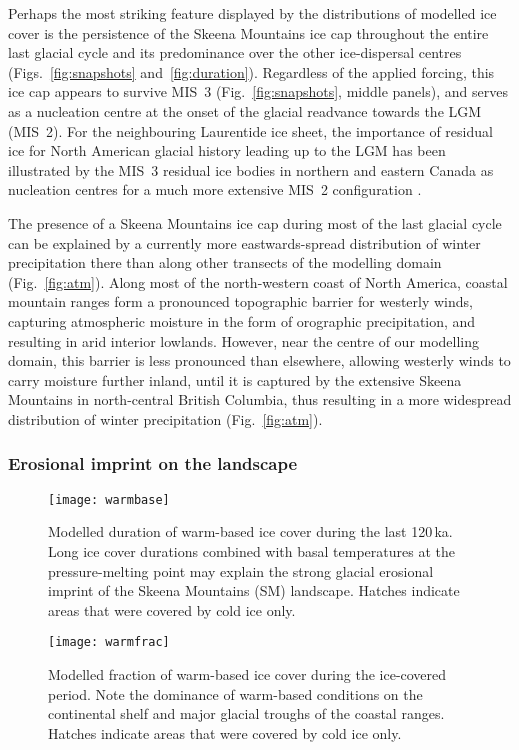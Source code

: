 \documentclass[tc]{copernicus}
\begin{document}
Perhaps the most striking feature displayed by the distributions of modelled
ice cover is the persistence of the Skeena Mountains ice cap throughout the
entire last glacial cycle and its predominance over the other ice-dispersal
centres
(Figs.~\ref{fig:snapshots} and~\ref{fig:duration}). Regardless of the applied
forcing, this ice cap appears to survive MIS~3 (Fig.~\ref{fig:snapshots},
middle panels), and serves as a nucleation centre at the onset of the glacial
readvance towards the LGM (MIS~2). For the neighbouring Laurentide ice sheet,
the importance of residual ice for North
American glacial history leading up to the LGM has been illustrated by the
MIS~3 residual ice bodies in northern and eastern Canada as nucleation centres
for a much more extensive MIS~2 configuration \citep{Kleman.etal.2010}.

The presence of a Skeena Mountains ice cap during most of the last glacial
cycle can be explained by a currently more eastwards-spread distribution of
winter precipitation there than along other transects of the
modelling domain (Fig.~\ref{fig:atm}). Along most of the north-western coast of
North America, coastal mountain ranges form a pronounced topographic barrier
for westerly winds, capturing atmospheric moisture in the form of orographic
precipitation, and resulting in arid interior lowlands. However, near the
centre of our modelling domain, this barrier is less pronounced than elsewhere,
allowing westerly winds to carry moisture
further inland, until it is captured by the extensive Skeena Mountains in
north-central British Columbia, thus resulting in a more widespread
distribution of winter precipitation (Fig.~\ref{fig:atm}).

\subsubsection{Erosional imprint on the landscape}

\begin{figure*}
  \texttt{[image: warmbase]}
  \caption{Modelled duration of warm-based ice cover during the last
           120\,ka. Long ice cover durations combined with basal
           temperatures at the pressure-melting point may explain the strong
           glacial erosional imprint of the Skeena Mountains (SM) landscape.
           Hatches indicate areas that were covered by cold ice only.}
  \label{fig:warmbase}
\end{figure*}

\begin{figure*}
  \vspace{-0.5mm}  %
  \texttt{[image: warmfrac]}
  \caption{Modelled fraction of warm-based ice cover during the ice-covered
           period. Note the dominance of warm-based conditions on the
           continental shelf and major glacial troughs of the coastal ranges.
           Hatches indicate areas that were covered by cold ice only.}
  \label{fig:warmfrac}
\end{figure*}
\end{document}
